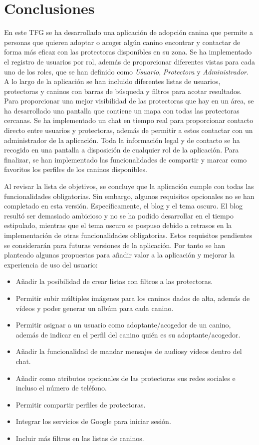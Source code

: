 \documentclass[a4paper, 12pt]{article}
\begin{document}
\newpage
\section{Conclusiones}

En este TFG se ha desarrollado una aplicación de adopción canina que permite a personas que quieren adoptar o acoger algún canino encontrar y contactar de forma más eficaz con las protectoras disponibles en su zona. Se ha implementado el registro de usuarios por rol, además de proporcionar diferentes vistas para cada uno de los roles, que se han definido como \textit{Usuario}, \textit{Protectora} y \textit{Administrador}. A lo largo de la aplicación se han incluido diferentes listas de usuarios, protectoras y caninos con barras de búsqueda y filtros para acotar resultados. Para proporcionar una mejor visibilidad de las protectoras que hay en un área, se ha desarrollado una pantalla que contiene un mapa con todas las protectoras cercanas. Se ha implementado un chat en tiempo real para proporcionar contacto directo entre usuarios y protectoras, además de permitir a estos contactar con un administrador de la aplicación. Toda la información legal y de contacto se ha recogido en una pantalla a disposición de cualquier rol de la aplicación. Para finalizar, se han implementado las funcionalidades de compartir y marcar como favoritos los perfiles de los caninos disponibles.

Al revisar la lista de objetivos, se concluye que la aplicación cumple con todas las funcionalidades obligatorias. Sin embargo, algunos requisitos opcionales no se han completado en esta versión. Específicamente, el blog y el tema oscuro. El blog resultó ser demasiado ambicioso y no se ha podido desarrollar en el tiempo estipulado, mientras que el tema oscuro se pospuso debido a retrasos en la implementación de otras funcionalidades obligatorias. Estos requisitos pendientes se considerarán para futuras versiones de la aplicación. Por tanto se han planteado algunas propuestas para añadir valor a la aplicación y mejorar la experiencia de uso del usuario:

\begin{itemize}[noitemsep]
	\item Añadir la posibilidad de crear listas con filtros a las protectoras.
	\item Permitir subir múltiples imágenes para los caninos dados de alta, además de vídeos y poder generar un albúm para cada canino.
	\item Permitir asignar a un usuario como adoptante/acogedor de un canino, además de indicar en el perfil del canino quién es su adoptante/acogedor.
	\item Añadir la funcionalidad de mandar mensajes de audiosy vídeos dentro del chat.
	\item Añadir como atributos opcionales de las protectoras sus redes sociales e incluso el número de teléfono.
	\item Permitir compartir perfiles de protectoras.
	\item Integrar los servicios de Google para iniciar sesión.
	\item Incluir más filtros en las listas de caninos.
\end{itemize}
\end{document}
